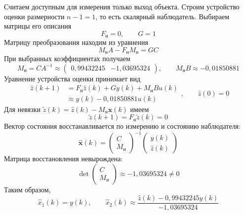 Считаем доступным для измерения только выход объекта.
Строим устройство оценки размерности
$n-1=1$, то есть скалярный наблюдатель.
Выбираем матрицы его описания
\begin{equation}
  F_{\text{н}}=0,\qquad G=1
  \label{eq:observer-dynamics}
\end{equation}
Матрицу преобразования находим из уравнения
\begin{equation}
  M_{\text{н}}A-F_{\text{н}}M_{\text{н}}=GC
  \label{eq:observer-sylvester}
\end{equation}
При выбранных коэффициентах получаем
\begin{equation}
  M_{\text{н}}=CA^{-1}
  \approx\begin{pmatrix}0{,}99432245&-1{,}03695324\end{pmatrix},
  \qquad
  M_{\text{н}}B\approx-0{,}01850881
  \label{eq:observer-matrices}
\end{equation}
Уравнение устройства оценки принимает вид
\begin{equation}
  \begin{aligned}
    \hat z(k+1)&=F_{\text{н}}\hat z(k)+Gy(k)+M_{\text{н}}Bu(k)\\
      &\approx y(k)-0{,}01850881u(k)
  \end{aligned},
  \qquad \hat z(0)=0
  \label{eq:observer}
\end{equation}
Для невязки $\tilde z(k)=\hat z(k)-M_{\text{н}}\bm x(k)$ имеем
\begin{equation}
  \tilde z(k+1)=F_{\text{н}}\tilde z(k)=0
  \label{eq:observer-error}
\end{equation}
Вектор состояния восстанавливается по измерению и состоянию наблюдателя:
\begin{equation}
  \hat{\bm x}(k)
  =\begin{pmatrix}C\\M_{\text{н}}\end{pmatrix}^{-1}
    \begin{pmatrix}y(k)\\\hat z(k)\end{pmatrix}
  \label{eq:state-estimate}
\end{equation}
Матрица восстановления невырождена:
\begin{equation}
  \det\begin{pmatrix}C\\M_{\text{н}}\end{pmatrix}
    \approx-1{,}03695324\ne0
  \label{eq:reconstruction-determinant}
\end{equation}
Таким образом,
\begin{equation}
  \hat x_1(k)=y(k),
  \qquad
  \hat x_2(k)\approx
    \frac{\hat z(k)-0{,}99432245y(k)}{-1{,}03695324}
  \label{eq:state-estimate-numeric}
\end{equation}

